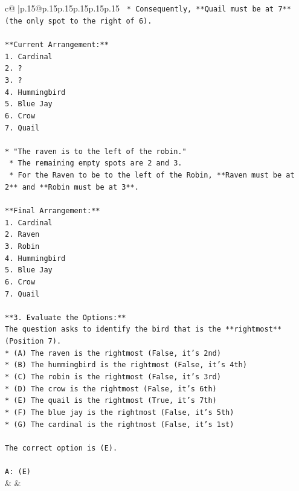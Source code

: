\documentclass{article}
\begin{document}
{\begin{supertabular}{c@{$\;$}|p{.15\linewidth}@{}p{.15\linewidth}p{.15\linewidth}p{.15\linewidth}p{.15\linewidth}p{.15\linewidth}}
{{{\texttt{    *   Consequently, **Quail must be at 7** (the only spot to the right of 6).} \\
\\ 
\texttt{**Current Arrangement:**} \\
\texttt{1. Cardinal} \\
\texttt{2. ?} \\
\texttt{3. ?} \\
\texttt{4. Hummingbird} \\
\texttt{5. Blue Jay} \\
\texttt{6. Crow} \\
\texttt{7. Quail} \\
\\ 
\texttt{*   "The raven is to the left of the robin."} \\
\texttt{    *   The remaining empty spots are 2 and 3.} \\
\texttt{    *   For the Raven to be to the left of the Robin, **Raven must be at 2** and **Robin must be at 3**.} \\
\\ 
\texttt{**Final Arrangement:**} \\
\texttt{1. Cardinal} \\
\texttt{2. Raven} \\
\texttt{3. Robin} \\
\texttt{4. Hummingbird} \\
\texttt{5. Blue Jay} \\
\texttt{6. Crow} \\
\texttt{7. Quail} \\
\\ 
\texttt{**3. Evaluate the Options:**} \\
\texttt{The question asks to identify the bird that is the **rightmost** (Position 7).} \\
\texttt{*   (A) The raven is the rightmost (False, it's 2nd)} \\
\texttt{*   (B) The hummingbird is the rightmost (False, it's 4th)} \\
\texttt{*   (C) The robin is the rightmost (False, it's 3rd)} \\
\texttt{*   (D) The crow is the rightmost (False, it's 6th)} \\
\texttt{*   (E) The quail is the rightmost (True, it's 7th)} \\
\texttt{*   (F) The blue jay is the rightmost (False, it's 5th)} \\
\texttt{*   (G) The cardinal is the rightmost (False, it's 1st)} \\
\\ 
\texttt{The correct option is (E).} \\
\\ 
\texttt{A: (E)} \\
            }
        }
    }
    & & \\ \\


\end{supertabular}}
\end{document}
